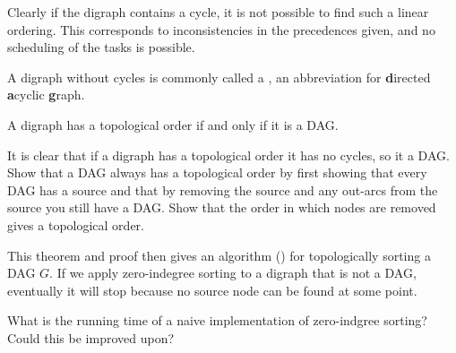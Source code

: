 %


Clearly if the digraph contains a cycle, it is not possible to find
such a linear ordering. This corresponds to inconsistencies in the
precedences given, and no scheduling of the tasks is possible.

\begin{Definition}
A digraph without cycles is commonly called a , an
abbreviation for \textbf{d}irected \textbf{a}cyclic
\textbf{g}raph.  
\end{Definition}


\begin{Theorem}
\label{thm:topDAG}
A digraph has a topological order if and only if it is a DAG.
\end{Theorem}

\begin{Boxample}[6]
It is clear that if a digraph has a topological order it has no cycles, so it a DAG. Show that a DAG always has a topological order by first showing that every DAG has a source and that by removing the source and any out-arcs from the source you still have a DAG. Show that the order in which nodes are removed gives a topological order.
\end{Boxample}

This theorem and proof then gives an algorithm ()
for topologically sorting a DAG $G$. If we apply zero-indegree sorting to a digraph that is not
a DAG, eventually it will stop because no source node can be found at
some point.

\begin{Boxample}[3]
What is the running time of a naive implementation of zero-indgree sorting? Could this be improved upon?
\end{Boxample}
%



